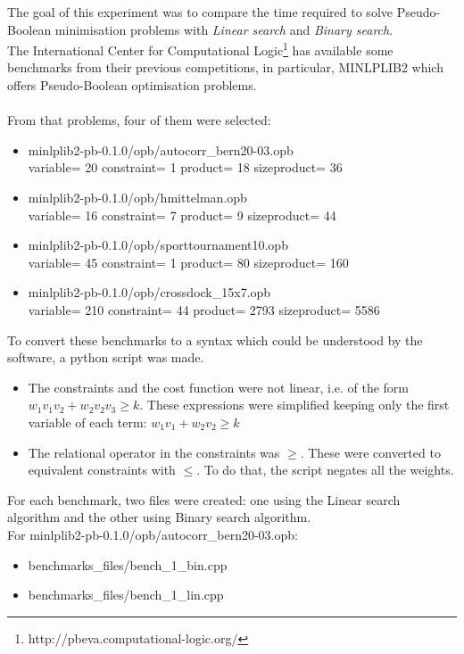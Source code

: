The goal of this experiment was to compare the time required to solve Pseudo-Boolean minimisation problems with \emph{Linear search} and \emph{Binary search}.\\
The International Center for Computational Logic\footnote{http://pbeva.computational-logic.org/} has available some benchmarks from their previous competitions, in particular, MINLPLIB2 which offers Pseudo-Boolean optimisation problems. \\\\
From that problems, four of them were selected:
\begin{itemize}
	\item minlplib2-pb-0.1.0/opb/autocorr\_bern20-03.opb\\ variable= 20 constraint= 1 product= 18 sizeproduct= 36
	\item minlplib2-pb-0.1.0/opb/hmittelman.opb\\ variable= 16 constraint= 7 product= 9 sizeproduct= 44
	\item minlplib2-pb-0.1.0/opb/sporttournament10.opb\\ variable= 45 constraint= 1 product= 80 sizeproduct= 160
	\item minlplib2-pb-0.1.0/opb/crossdock\_15x7.opb\\ variable= 210 constraint= 44 product= 2793 sizeproduct= 5586
\end{itemize}
To convert these benchmarks to a syntax which could be understood by the software, a python script was made.
\begin{itemize}
	\item The constraints and the cost function were not linear, i.e. of the form $w_1 v_1 v_2 + w_2 v_2 v_3 \geq k$. These expressions were simplified keeping only the first variable of each term: $w_1 v_1+ w_2 v_2 \geq k$ 
	\item The relational operator in the constraints was $\geq$. These were converted to equivalent constraints with $\leq$. To do that, the script negates all the weights. 
\end{itemize}
For each benchmark, two files were created: one using the Linear search algorithm and the other using Binary search algorithm.\\
For minlplib2-pb-0.1.0/opb/autocorr\_bern20-03.opb:
\begin{itemize}
	\item benchmarks\_files/bench\_1\_bin.cpp
	\item benchmarks\_files/bench\_1\_lin.cpp
\end{itemize}
